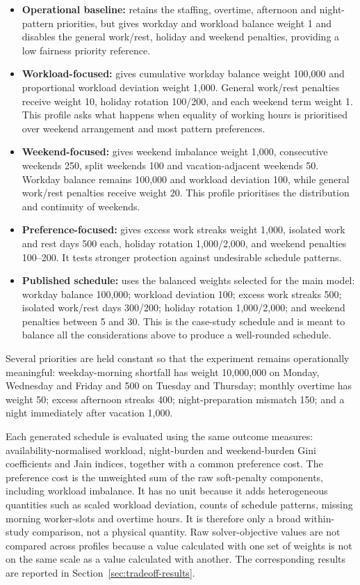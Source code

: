 \documentclass[11pt,a4paper]{article}
\begin{document}
\begin{itemize}
  \item \textbf{Operational baseline:} retains the staffing, overtime, afternoon and night-pattern priorities, but gives workday and workload balance weight 1 and disables the general work/rest, holiday and weekend penalties, providing a low fairness priority reference.

  \item \textbf{Workload-focused:} gives cumulative workday balance weight 100,000 and proportional workload deviation weight 1,000. General work/rest penalties receive weight 10, holiday rotation 100/200, and each weekend term weight 1. This profile asks what happens when equality of working hours is prioritised over weekend arrangement and most pattern preferences.

  \item \textbf{Weekend-focused:} gives weekend imbalance weight 1,000, consecutive weekends 250, split weekends 100 and vacation-adjacent weekends 50. Workday balance remains 100,000 and workload deviation 100, while general work/rest penalties receive weight 20. This profile prioritises the distribution and continuity of weekends.

  \item \textbf{Preference-focused:} gives excess work streaks weight 1,000, isolated work and rest days 500 each, holiday rotation 1,000/2,000, and weekend penalties 100--200. It tests stronger protection against undesirable schedule patterns.

  \item \textbf{Published schedule:} uses the balanced weights selected for the main model: workday balance 100,000; workload deviation 100; excess work streaks 500; isolated work/rest days 300/200; holiday rotation 1,000/2,000; and weekend penalties between 5 and 30. This is the case-study schedule and is meant to balance all the considerations above to produce a well-rounded schedule.
\end{itemize}

Several priorities are held constant so that the experiment remains operationally meaningful: weekday-morning shortfall has weight 10,000,000 on Monday, Wednesday and Friday and 500 on Tuesday and Thursday; monthly overtime has weight 50; excess afternoon streaks 400; night-preparation mismatch 150; and a night immediately after vacation 1,000.

Each generated schedule is evaluated using the same outcome measures: availability-normalised workload, night-burden and weekend-burden Gini coefficients and Jain indices, together with a common preference cost. The preference cost is the unweighted sum of the raw soft-penalty components, including workload imbalance. It has no unit because it adds heterogeneous quantities such as scaled workload deviation, counts of schedule patterns, missing morning worker-slots and overtime hours. It is therefore only a broad within-study comparison, not a physical quantity. Raw solver-objective values are not compared across profiles because a value calculated with one set of weights is not on the same scale as a value calculated with another. The corresponding results are reported in Section~\ref{sec:tradeoff-results}.
\end{document}
